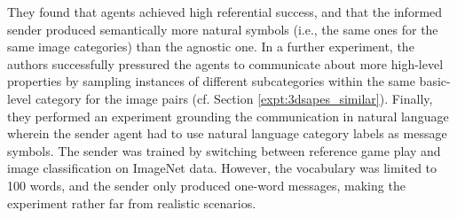 They found that agents achieved high referential success, and that the informed sender produced semantically more natural symbols (i.e., the same ones for the same image categories) than the agnostic one. In a further experiment, the authors successfully pressured the agents to communicate about more high-level properties by sampling instances of different subcategories within the same basic-level category for the image pairs (cf. Section \ref{expt:3dsapes_similar}). %
Finally, they performed an experiment grounding the communication in natural language wherein the sender agent had to use natural language category labels as message symbols. The sender was trained by switching between reference game play and image classification on ImageNet data. However, the vocabulary was limited to 100 words, and the sender only produced one-word messages, making the experiment rather far from realistic scenarios. %
	
